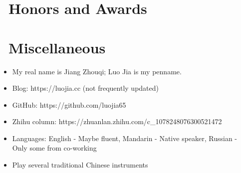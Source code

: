 \documentclass{resume}
\begin{document}
\section{\faHeartO\ Honors and Awards}

\section{\faInfo\ Miscellaneous}
\begin{itemize}[parsep=0.5ex]
  \item My real name is Jiang Zhouqi; Luo Jia is my penname.
  \item Blog: https://luojia.cc (not frequently updated)
  \item GitHub: https://github.com/luojia65
  \item Zhihu column: https://zhuanlan.zhihu.com/c\_1078248076300521472
  \item Languages: English - Maybe fluent, Mandarin - Native speaker, Russian - Only some from co-working
  \item Play several traditional Chinese instruments
\end{itemize}

%
%
\end{document}
